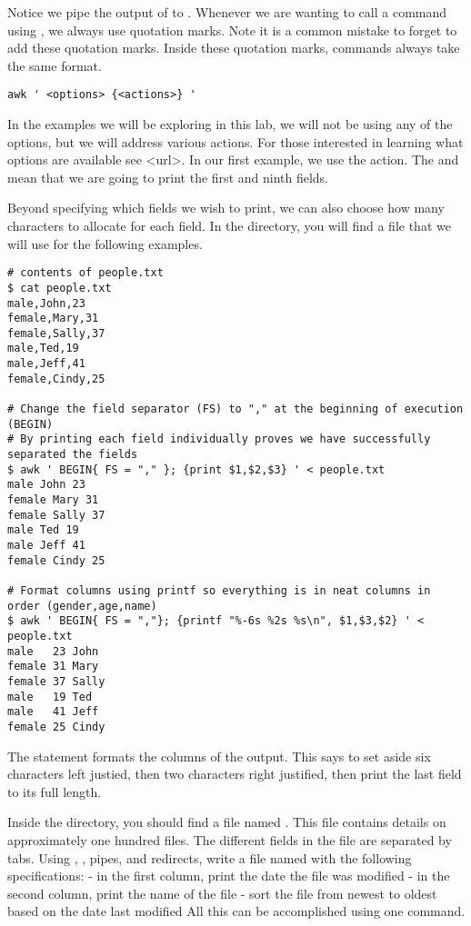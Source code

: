 Notice we pipe the output of  to . Whenever we are wanting to call a command using , we always use quotation marks. Note it is a common mistake to forget to add these quotation marks. Inside these quotation marks, commands always take the same format.

\begin{lstlisting}
awk ' <options> {<actions>} '
\end{lstlisting}

In the examples we will be exploring in this lab, we will not be using any of the options, but we will address various actions. For those interested in learning what options are available see <url>. In our first example, we use the  action. The  and  mean that we are going to print the first and ninth fields.

Beyond specifying which fields we wish to print, we can also choose how many characters to allocate for each field. In the  directory, you will find a  file that we will use for the following examples.

\begin{lstlisting}
# contents of people.txt
$ cat people.txt
male,John,23
female,Mary,31
female,Sally,37
male,Ted,19
male,Jeff,41
female,Cindy,25

# Change the field separator (FS) to "," at the beginning of execution (BEGIN)
# By printing each field individually proves we have successfully separated the fields
$ awk ' BEGIN{ FS = "," }; {print $1,$2,$3} ' < people.txt
male John 23
female Mary 31
female Sally 37
male Ted 19
male Jeff 41
female Cindy 25

# Format columns using printf so everything is in neat columns in order (gender,age,name)
$ awk ' BEGIN{ FS = ","}; {printf "%-6s %2s %s\n", $1,$3,$2} ' < people.txt
male   23 John
female 31 Mary
female 37 Sally
male   19 Ted
male   41 Jeff
female 25 Cindy
\end{lstlisting}

The statement  formats the columns of the output. This says to set aside six characters left justied, then two characters right justified, then print the last field to its full length.

\begin{problem}
Inside the  directory, you should find a file named . This file contains details on approximately one hundred files. The different fields in the file are separated by tabs. Using , , pipes, and redirects, write a file named  with the following specifications:
- in the first column, print the date the file was modified
- in the second column, print the name of the file
- sort the file from newest to oldest based on the date last modified
All this can be accomplished using one command.
\end{problem}

